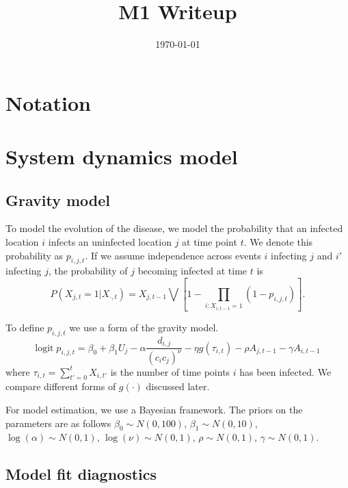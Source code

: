 \documentclass[11pt]{article}
\date{\today}
\title{M1 Writeup}
\newcommand{\logit}{\text{logit}}
\begin{document}
\maketitle
\tableofcontents


\section{Notation}
\label{sec-1}

\section{System dynamics model}
\label{sec-2}

\subsection{Gravity model}
\label{sec-2-1}

To model the evolution of the disease, we model the probability that
an infected location $i$ infects an uninfected location $j$ at time
point $t$.  We denote this probability as $p_{i,j,t}$.  If we assume
independence across events $i$ infecting $j$ and $i'$ infecting $j$,
the probability of $j$ becoming infected at time $t$ is
\begin{equation*}
  P(X_{j,t} = 1 | X_{\cdot,t}) = X_{j,t-1} \bigvee \left[1 - \prod_{i:
  X_{i,t-1} = 1} ( 1 - p_{i,j,t} ) \right].
\end{equation*}

To define $p_{i,j,t}$ we use a form of the gravity model.
\begin{equation*}
  \logit \; p_{i,j,t} = \beta_0 + \beta_1 U_j 
  - \alpha \frac{d_{i,j}}{(c_ic_j)^\nu} - \eta g(\tau_{i,t})
  - \rho A_{j,t-1} - \gamma A_{i,t-1}
\end{equation*}
where $\tau_{i,t} = \sum_{t' = 0}^t X_{i,t'}$ is the number of time
points $i$ has been infected.  We compare different forms of
$g(\cdot)$ discussed later.

For model estimation, we use a Bayesian framework.  The priors on the
parameters are as follows $\beta_0 \sim N(0,100)$, $\beta_1 \sim
N(0,10)$, $\log(\alpha) \sim N(0,1)$, $\log(\nu) \sim N(0,1)$, $\rho
\sim N(0,1)$, $\gamma \sim N(0,1)$.


\subsection{Model fit diagnostics}
\label{sec-2-2}
\end{document}
